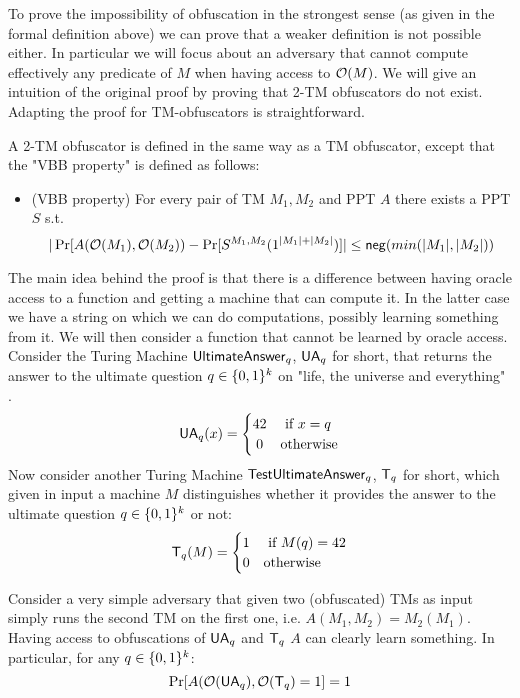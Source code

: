To prove the impossibility of obfuscation in the strongest sense (as given in the formal definition above) we can prove that a weaker definition is not possible either. In particular we will focus about an adversary that cannot compute effectively any predicate of $M$ when having access to $\mathcal{O}(M)$.
We will give an intuition of the original proof by proving that 2-TM obfuscators do not exist. Adapting the proof for TM-obfuscators is straightforward.

\begin{mydef}
	A 2-TM obfuscator is defined in the same way as a TM obfuscator, except that the "VBB property" is defined as follows:
	\begin{itemize}
		\item (VBB property) For every pair of TM $M_1, M_2$ and PPT $A$ there exists a PPT $S$ s.t. 
		$$ |\Pr[A(\mathcal{O}(M_1), \mathcal{O}(M_2)) - \Pr[ S^{M_1,M_2}(1^{|M_1|+|M_2|})]| \leq \mathsf{neg}(min(|M_1|, |M_2|)) $$
	\end{itemize}
\end{mydef} 

The main idea behind the proof is that there is a difference between having oracle access to a function and getting a machine that can compute it. In the latter case we have a string on which we can do computations, possibly learning something from it.
We will then consider a function that cannot be learned by oracle access. Consider the Turing Machine
 $\mathsf{UltimateAnswer}_q$, $\mathsf{UA}_q$ for short, that returns the 
 answer to the ultimate question $q \in \{0,1\}^k$ on "life, the universe and everything" \cite{adams}.
\[
\UA_q(x) =
\begin{cases} 
\hfill 42    \hfill & \text{ if $x = q$} \\
\hfill 0 \hfill & \text{otherwise} \\
\end{cases}
\]
Now consider another Turing Machine $\mathsf{TestUltimateAnswer}_q$, $\mathsf{T}_q$ for short, which given in input a machine $M$ distinguishes whether it provides the answer to the ultimate question $q \in \{0,1\}^k$ or not:
\[
\T_q(M) =
\begin{cases} 
\hfill 1    \hfill & \text{ if $M(q) = 42$} \\
\hfill 0 \hfill & \text{otherwise} \\
\end{cases}
\]

Consider a very simple adversary that given two (obfuscated) TMs as input simply runs the second TM on the first one, i.e. $A(M_1, M_2) = M_2(M_1)$. Having access to obfuscations of $\mathsf{UA}_q$ and $\mathsf{T}_q$ $A$ can clearly learn something. In particular, for any $q \in \{0,1\}^k$:
\begin{equation} \Pr[A(\mathcal{O}(\mathsf{UA}_q), \mathcal{O}(\mathsf{T}_q) = 1] = 1 \end{equation}

